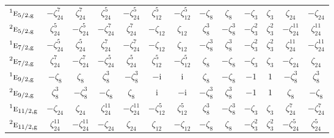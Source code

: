 \documentclass[10pt,a4paper]{article}
\numberwithin{equation}{section}
\newcommand{\irr}[1]{\text{\normalfont\scshape #1}}
\newcommand{\conjpair}[1]{{}^{#1}}
\newcommand{\ptag}[1]{\mathrm{#1}}
\newcommand{\iunit}{\mathrm{i}}
\newcommand{\rootunity}[1]{\zeta_{#1}}
\begin{document}
{\begin{longtable}{@{}lcccccccccccc@{}}
$\conjpair{1}\irr{e}_{5/2,\ptag{g}}$ & $-\rootunity{24}^{7}$ & $\rootunity{24}^{7}$ & $\rootunity{24}^{5}$ & $-\rootunity{24}^{5}$ & $\rootunity{12}^{5}$ & $-\rootunity{12}^{5}$ & $-\rootunity{8}$ & $\rootunity{8}$ & $-\rootunity{3}$ & $\rootunity{3}$ & $\rootunity{24}$ & $-\rootunity{24}$\\
$\conjpair{2}\irr{e}_{5/2,\ptag{g}}$ & $\rootunity{24}^{5}$ & $-\rootunity{24}^{5}$ & $-\rootunity{24}^{7}$ & $\rootunity{24}^{7}$ & $-\rootunity{12}$ & $\rootunity{12}$ & $\rootunity{8}^{3}$ & $-\rootunity{8}^{3}$ & $-\rootunity{3}^{2}$ & $\rootunity{3}^{2}$ & $-\rootunity{24}^{11}$ & $\rootunity{24}^{11}$\\
$\conjpair{1}\irr{e}_{7/2,\ptag{g}}$ & $-\rootunity{24}^{5}$ & $\rootunity{24}^{5}$ & $\rootunity{24}^{7}$ & $-\rootunity{24}^{7}$ & $-\rootunity{12}$ & $\rootunity{12}$ & $-\rootunity{8}^{3}$ & $\rootunity{8}^{3}$ & $-\rootunity{3}^{2}$ & $\rootunity{3}^{2}$ & $\rootunity{24}^{11}$ & $-\rootunity{24}^{11}$\\
$\conjpair{2}\irr{e}_{7/2,\ptag{g}}$ & $\rootunity{24}^{7}$ & $-\rootunity{24}^{7}$ & $-\rootunity{24}^{5}$ & $\rootunity{24}^{5}$ & $\rootunity{12}^{5}$ & $-\rootunity{12}^{5}$ & $\rootunity{8}$ & $-\rootunity{8}$ & $-\rootunity{3}$ & $\rootunity{3}$ & $-\rootunity{24}$ & $\rootunity{24}$\\
$\conjpair{1}\irr{e}_{9/2,\ptag{g}}$ & $-\rootunity{8}$ & $\rootunity{8}$ & $\rootunity{8}^{3}$ & $-\rootunity{8}^{3}$ & $-\iunit{}$ & $\iunit{}$ & $\rootunity{8}$ & $-\rootunity{8}$ & $-1$ & $1$ & $-\rootunity{8}^{3}$ & $\rootunity{8}^{3}$\\
$\conjpair{2}\irr{e}_{9/2,\ptag{g}}$ & $\rootunity{8}^{3}$ & $-\rootunity{8}^{3}$ & $-\rootunity{8}$ & $\rootunity{8}$ & $\iunit{}$ & $-\iunit{}$ & $-\rootunity{8}^{3}$ & $\rootunity{8}^{3}$ & $-1$ & $1$ & $\rootunity{8}$ & $-\rootunity{8}$\\
$\conjpair{1}\irr{e}_{11/2,\ptag{g}}$ & $-\rootunity{24}$ & $\rootunity{24}$ & $\rootunity{24}^{11}$ & $-\rootunity{24}^{11}$ & $-\rootunity{12}^{5}$ & $\rootunity{12}^{5}$ & $\rootunity{8}^{3}$ & $-\rootunity{8}^{3}$ & $-\rootunity{3}$ & $\rootunity{3}$ & $\rootunity{24}^{7}$ & $-\rootunity{24}^{7}$\\
$\conjpair{2}\irr{e}_{11/2,\ptag{g}}$ & $\rootunity{24}^{11}$ & $-\rootunity{24}^{11}$ & $-\rootunity{24}$ & $\rootunity{24}$ & $\rootunity{12}$ & $-\rootunity{12}$ & $-\rootunity{8}$ & $\rootunity{8}$ & $-\rootunity{3}^{2}$ & $\rootunity{3}^{2}$ & $-\rootunity{24}^{5}$ & $\rootunity{24}^{5}$\\

\end{longtable}}
\end{document}
